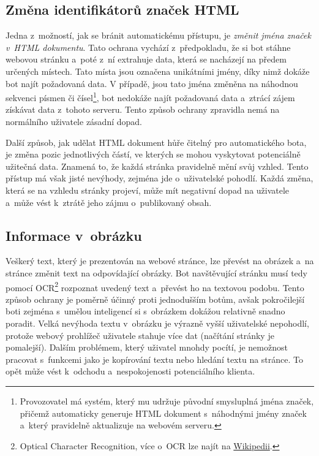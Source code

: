 \subsection*{Změna identifikátorů značek HTML}
Jedna z~možností, jak se bránit automatickému přístupu, je \textit{změnit jména značek v~HTML dokumentu}. Tato ochrana vychází z~předpokladu, že si bot stáhne webovou stránku a~poté z~ní extrahuje data, která se nacházejí na předem určených místech. Tato místa jsou označena unikátními jmény, díky nimž dokáže bot najít požadovaná data. V případě, jsou tato jména změněna na náhodnou sekvenci písmen či čísel\footnote{Provozovatel má systém, který mu udržuje původní smysluplná jména značek, přičemž automaticky generuje HTML dokument s~náhodnými jmény značek a~který pravidelně aktualizuje na webovém serveru.}, bot nedokáže najít požadovaná data a~ztrácí zájem získávat data z~tohoto serveru. Tento způsob ochrany zpravidla nemá na normálního uživatele zásadní dopad.

Další způsob, jak udělat HTML dokument hůře čitelný pro automatického bota, je změna pozic jednotlivých částí, ve kterých se mohou vyskytovat potenciálně užitečná data. Znamená to, že každá stránka pravidelně mění svůj vzhled. Tento přístup má však jisté nevýhody, zejména jde o~uživatelské pohodlí. Každá změna, která se na vzhledu stránky projeví, může mít negativní dopad na uživatele a~může vést k~ztrátě jeho zájmu o~publikovaný obsah.

\subsection*{Informace v~obrázku}
Veškerý text, který je prezentován na webové stránce, lze převést na obrázek a~na stránce změnit text na odpovídající obrázky. Bot navštěvující stránku musí tedy pomocí OCR\footnote{Optical Character Recognition, více o~OCR lze najít na \href{https://en.wikipedia.org/wiki/Optical_character_recognition}{Wikipedii}.} rozpoznat uvedený text a~převést ho na textovou podobu. Tento způsob ochrany je poměrně účinný proti jednodušším botům, avšak pokročilejší boti zejména s~umělou inteligencí si s~obrázkem dokážou relativně snadno poradit. Velká nevýhoda textu v~obrázku je výrazně vyšší uživatelské nepohodlí, protože webový prohlížeč uživatele stahuje více dat (načítání stránky je pomalejší). Dalším problémem, který uživatel mnohdy pocítí, je nemožnost pracovat s~funkcemi jako je kopírování textu nebo hledání textu na stránce. To opět může vést k~odchodu a~nespokojenosti potenciálního klienta.


